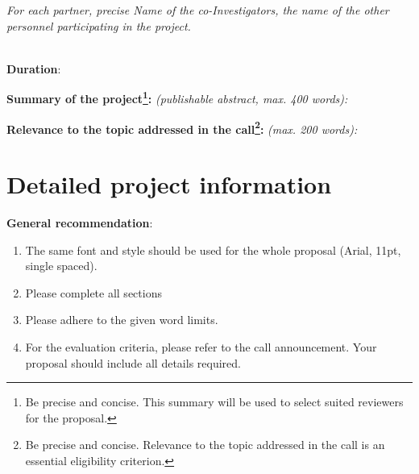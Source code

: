 \documentclass[11pt,twoside,a4paper]{article}
\begin{document}
\emph{For each partner, precise Name of the co-Investigators, the name of the
  other personnel participating in the project.} 

~\\[2em]
\textbf{Duration}: 

\textbf{Summary of the project\footnote{Be precise and concise. This summary will be used to select suited reviewers for the proposal.}:} \emph{(publishable abstract, max. 400 words):}


\textbf{Relevance to the topic addressed in the call\footnote{Be precise and concise. Relevance to the topic addressed in the call is an essential eligibility criterion.}:} \emph{(max. 200 words):}


\section{Detailed project information}

\textbf{General recommendation}:
\begin{enumerate}
  \item The same font and style should be used for the whole proposal (Arial,
    11pt, single spaced).
  \item Please complete all sections
  \item Please adhere to the given word limits.
  \item For the evaluation criteria, please refer to the call announcement. Your
    proposal should include all details required. 
\end{enumerate}





\end{document}
